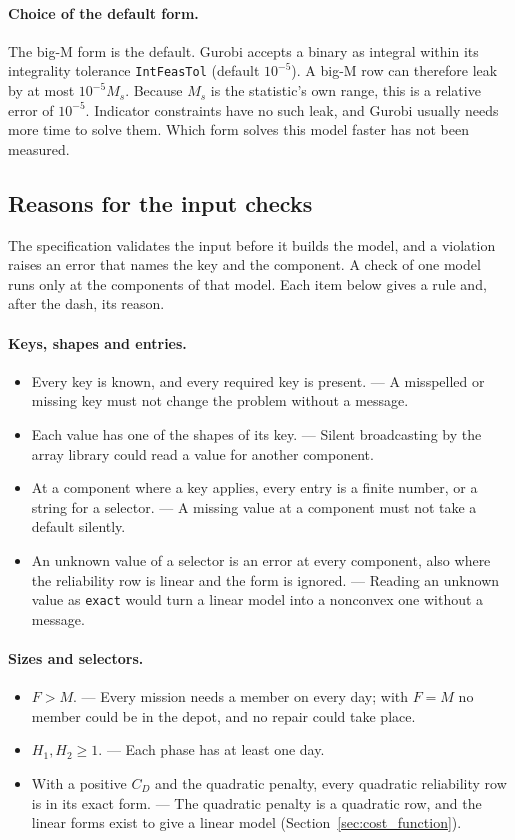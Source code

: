 \documentclass[11pt,a4paper]{article}
\theoremstyle{plain}
\theoremstyle{definition}
\theoremstyle{remark}
\begin{document}
\paragraph{Choice of the default form.}
The big-M form is the default.
Gurobi accepts a binary as integral within its integrality tolerance \texttt{IntFeasTol} (default $10^{-5}$).
A big-M row can therefore leak by at most $10^{-5} M_s$.
Because $M_s$ is the statistic's own range, this is a relative error of $10^{-5}$.
Indicator constraints have no such leak, and Gurobi usually needs more time to solve them.
Which form solves this model faster has not been measured.

\subsection{Reasons for the input checks}
\label{sec:check_reasons}

The specification validates the input before it builds the model, and a violation raises an error that names the key and the component.
A check of one model runs only at the components of that model.
Each item below gives a rule and, after the dash, its reason.

\paragraph{Keys, shapes and entries.}
\begin{itemize}[nosep]
  \item Every key is known, and every required key is present. --- A misspelled or missing key must not change the problem without a message.
  \item Each value has one of the shapes of its key. --- Silent broadcasting by the array library could read a value for another component.
  \item At a component where a key applies, every entry is a finite number, or a string for a selector. --- A missing value at a component must not take a default silently.
  \item An unknown value of a selector is an error at every component, also where the reliability row is linear and the form is ignored. --- Reading an unknown value as \texttt{exact} would turn a linear model into a nonconvex one without a message.
\end{itemize}

\paragraph{Sizes and selectors.}
\begin{itemize}[nosep]
  \item $F > M$. --- Every mission needs a member on every day; with $F = M$ no member could be in the depot, and no repair could take place.
  \item $H_1, H_2 \ge 1$. --- Each phase has at least one day.
  \item With a positive $C_D$ and the quadratic penalty, every quadratic reliability row is in its exact form. --- The quadratic penalty is a quadratic row, and the linear forms exist to give a linear model (Section~\ref{sec:cost_function}).
\end{itemize}
\end{document}
